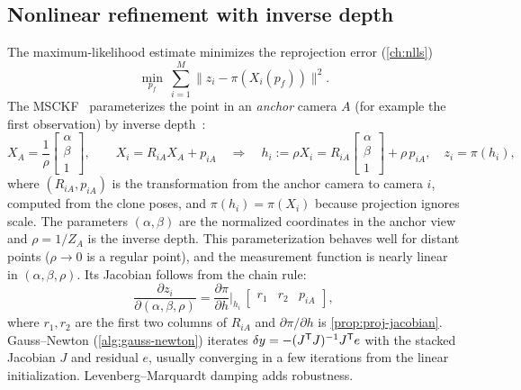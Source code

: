 \subsection{Nonlinear refinement with inverse depth}

The maximum-likelihood estimate minimizes the reprojection error (\cref{ch:nlls})
\begin{equation}
  \min_{p_f}\ \sum_{i=1}^M \big\| z_i - \pi(X_i(p_f)) \big\|^2 .
\end{equation}
The MSCKF~\cite{mourikis2007msckf} parameterizes the point in an \emph{anchor} camera $A$ (for example the first observation) by inverse depth~\cite{civera2008inverse}:
\begin{equation}
  X_A = \frac1\rho\begin{bmatrix} \alpha \\ \beta \\ 1 \end{bmatrix}, \qquad
  X_i = R_{iA}X_A + p_{iA}
  \quad\Longrightarrow\quad
  h_i := \rho X_i = R_{iA}\begin{bmatrix}\alpha\\ \beta\\ 1\end{bmatrix} + \rho\,p_{iA}, \quad z_i = \pi(h_i),
\end{equation}
where $(R_{iA}, p_{iA})$ is the transformation from the anchor camera to camera $i$, computed from the clone poses, and $\pi(h_i) = \pi(X_i)$ because projection ignores scale.
The parameters $(\alpha, \beta)$ are the normalized coordinates in the anchor view and $\rho = 1/Z_A$ is the inverse depth. This parameterization behaves well for distant points
($\rho\to0$ is a regular point), and the measurement function is nearly linear in $(\alpha, \beta, \rho)$. Its Jacobian follows from the chain rule:
\begin{equation}
  \frac{\partial z_i}{\partial(\alpha, \beta, \rho)} = \frac{\partial\pi}{\partial h}\Big|_{h_i}\,
  \begin{bmatrix} r_1 & r_2 & p_{iA} \end{bmatrix},
\end{equation}
where $r_1, r_2$ are the first two columns of $R_{iA}$ and $\partial\pi/\partial h$ is \cref{prop:proj-jacobian}. Gauss--Newton (\cref{alg:gauss-newton}) iterates
$\delta y = -(J^{\mathsf{T}} J)^{-1} J^{\mathsf{T}} e$ with the stacked Jacobian $J$ and residual $e$, usually converging in a few iterations from the linear initialization. Levenberg--Marquardt
damping adds robustness.

